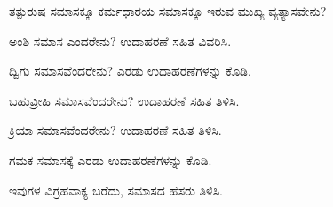 \vspace{2.5pt plus 3pt minus 0.5pt}\noindent\hspace*{1.2em}\hspace{0.55em}ತತ್ಪುರುಷ ಸಮಾಸಕ್ಕೂ ಕರ್ಮಧಾರಯ ಸಮಾಸಕ್ಕೂ ಇರುವ ಮುಖ್ಯ ವ್ಯತ್ಯಾಸವೇನು?\par

\vspace{2.5pt plus 3pt minus 0.5pt}\noindent\hspace*{1.2em}\hspace{0.55em}ಅಂಶಿ ಸಮಾಸ ಎಂದರೇನು? ಉದಾಹರಣೆ ಸಹಿತ ವಿವರಿಸಿ.\par

\vspace{2.5pt plus 3pt minus 0.5pt}\noindent\hspace*{1.2em}\hspace{0.55em}ದ್ವಿಗು ಸಮಾಸವೆಂದರೇನು? ಎರಡು ಉದಾಹರಣೆಗಳನ್ನು ಕೊಡಿ.\par

\vspace{2.5pt plus 3pt minus 0.5pt}\noindent\hspace*{1.2em}\hspace{0.55em}ಬಹುವ್ರೀಹಿ ಸಮಾಸವೆಂದರೇನು? ಉದಾಹರಣೆ ಸಹಿತ ತಿಳಿಸಿ.\par

\vspace{2.5pt plus 3pt minus 0.5pt}\noindent\hspace*{1.2em}\hspace{0.55em}ಕ್ರಿಯಾ ಸಮಾಸವೆಂದರೇನು? ಉದಾಹರಣೆ ಸಹಿತ ತಿಳಿಸಿ.\par

\vspace{2.5pt plus 3pt minus 0.5pt}\noindent\hspace*{1.2em}\hspace{0.55em}ಗಮಕ ಸಮಾಸಕ್ಕೆ ಎರಡು ಉದಾಹರಣೆಗಳನ್ನು ಕೊಡಿ.\par

\vspace{2.5pt plus 3pt minus 0.5pt}\noindent\hspace*{1.2em}\hspace{0.55em}ಇವುಗಳ ವಿಗ್ರಹವಾಕ್ಯ ಬರೆದು, ಸಮಾಸದ ಹೆಸರು ತಿಳಿಸಿ.\par


